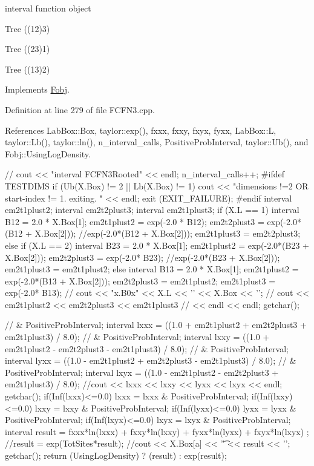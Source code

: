 interval function object 

\-Tree ((12)3)

\-Tree ((23)1)

\-Tree ((13)2) 

\-Implements \hyperlink{classFobj_acf5ccd1fd7b302c8a1c77081b606a6ad}{\-Fobj}.



\-Definition at line 279 of file \-F\-C\-F\-N3.\-cpp.



\-References \-Lab\-Box\-::\-Box, taylor\-::exp(), fxxx, fxxy, fxyx, fyxx, \-Lab\-Box\-::\-L, taylor\-::\-Lb(), taylor\-::ln(), n\-\_\-interval\-\_\-calls, \-Positive\-Prob\-Interval, taylor\-::\-Ub(), and \-Fobj\-::\-Using\-Log\-Density.


\begin{DoxyCode}
{
  //  cout << "interval FCFN3Rooted" << endl;
  n_interval_calls++;
  #ifdef TESTDIMS
  if (Ub(X.Box) != 2 || Lb(X.Box) != 1)
  {
    cout << "dimensions !=2 OR start-index != 1. exiting. " 
         << endl; exit (EXIT_FAILURE);
  }
  #endif
  interval em2t1plust2;
  interval em2t2plust3;
  interval em2t1plust3;
  if (X.L == 1)     
  {
    interval B12 = 2.0 * X.Box[1];
    em2t1plust2 = exp(-2.0 * B12);
    em2t2plust3 = exp(-2.0*(B12 + X.Box[2]));
                    //exp(-2.0*(B12 + X.Box[2]));
    em2t1plust3 = em2t2plust3;
  }
  else if (X.L == 2)
  {
    interval B23 = 2.0 * X.Box[1];
    em2t1plust2 = exp(-2.0*(B23 + X.Box[2]));
    em2t2plust3 = exp(-2.0* B23);
                    //exp(-2.0*(B23 + X.Box[2]));
    em2t1plust3 = em2t1plust2;
  }
  else              
  {
    interval B13 = 2.0 * X.Box[1];
    em2t1plust2 = exp(-2.0*(B13 + X.Box[2]));
    em2t2plust3 = em2t1plust2;
    em2t1plust3 = exp(-2.0* B13);
  }
  // cout << "x.B0x\n" << X.L << '\n' << X.Box << '\n';
  // cout << em2t1plust2 << em2t2plust3 << em2t1plust3 
  // << endl << endl; getchar();

                    // & PositiveProbInterval;
  interval lxxx = ((1.0 + em2t1plust2 + em2t2plust3 + em2t1plust3) / 8.0);
                    // & PositiveProbInterval;
  interval lxxy = ((1.0 + em2t1plust2 - em2t2plust3 - em2t1plust3) / 8.0);
                    // & PositiveProbInterval;
  interval lyxx = ((1.0 - em2t1plust2 + em2t2plust3 - em2t1plust3) / 8.0);
                    // & PositiveProbInterval;
  interval lxyx = ((1.0 - em2t1plust2 - em2t2plust3 + em2t1plust3) / 8.0);
  //cout << lxxx << lxxy << lyxx << lxyx << endl; getchar();
  if(Inf(lxxx)<=0.0) lxxx = lxxx & PositiveProbInterval;
  if(Inf(lxxy)<=0.0) lxxy = lxxy & PositiveProbInterval;
  if(Inf(lyxx)<=0.0) lyxx = lyxx & PositiveProbInterval;
  if(Inf(lxyx)<=0.0) lxyx = lxyx & PositiveProbInterval;
  interval result = fxxx*ln(lxxx) + fxxy*ln(lxxy) + fyxx*ln(lyxx) + 
                    fxyx*ln(lxyx) ;
  //result = exp(TotSites*result);
  //cout << X.Box[a] << '\t' << result << '\n'; getchar();
  return (UsingLogDensity) ? (result) : exp(result);
}
\end{DoxyCode}
